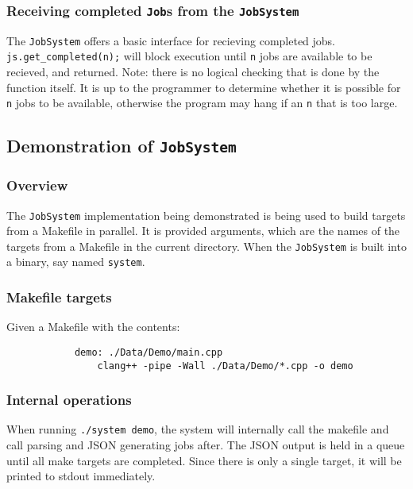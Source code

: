 \documentclass{article}
\begin{document}
		\subsubsection{Receiving completed \texttt{Job}s from the \texttt{JobSystem}}
			The \texttt{JobSystem} offers a basic interface for recieving completed jobs. \texttt{js.get\_completed(n);} will block execution until \texttt{n} jobs are available to be recieved, and returned. Note: there is no logical checking that is done by the function itself. It is up to the programmer to determine whether it is possible for \texttt{n} jobs to be available, otherwise the program may hang if an \texttt{n} that is too large.
	
	\subsection{Demonstration of \texttt{JobSystem}}
		\subsubsection{Overview}
			The \texttt{JobSystem} implementation being demonstrated is being used to build targets from a Makefile in parallel. It is provided arguments, which are the names of the targets from a Makefile in the current directory. When the \texttt{JobSystem} is built into a binary, say named \texttt{system}.
			
		\subsubsection{Makefile targets}
			Given a Makefile with the contents:
			\begin{verbatim}
			demo: ./Data/Demo/main.cpp
				clang++ -pipe -Wall ./Data/Demo/*.cpp -o demo
			\end{verbatim}
		\subsubsection{Internal operations}
			When running \texttt{./system demo}, the system will internally call the makefile and call parsing and JSON generating jobs after. The JSON output is held in a queue until all make targets are completed. Since there is only a single target, it will be printed to stdout immediately.
\end{document}
